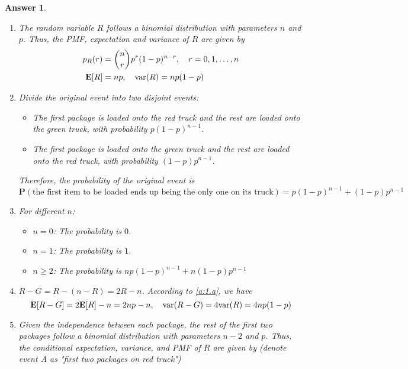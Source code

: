 \documentclass[utf8]{article}
\theoremstyle{definition}%
\theoremstyle{plain}%
\newtheorem{answer}{Answer} %
\begin{document}
\begin{answer} ~
    \begin{enumerate}[label=(\alph*)]
        \item \label{a:1.a} The random variable $R$ follows a binomial distribution with parameters $n$ and $p$. Thus, the PMF, expectation and variance of $R$ are given by
        \begin{equation}
        \begin{aligned}
            p_R(r) &= \binom{n}{r} p^r (1 - p)^{n - r}, \quad r = 0, 1, \ldots, n \\ 
            \mathbf{E}[R] &= np, \quad \mathrm{var}(R) = np(1 - p)
        \end{aligned}
        \end{equation}
        \item Divide the original event into two disjoint events: \begin{itemize}
            \item The first package is loaded onto the red truck and the rest are loaded onto the green truck, with probability $p(1 - p)^{n - 1}$.
            \item The first package is loaded onto the green truck and the rest are loaded onto the red truck, with probability $(1 - p)p^{n - 1}$.
        \end{itemize}
        Therefore, the probability of the original event is
        \begin{equation}
            \mathbf{P}(\text{the first item to be loaded ends up being the only one on its truck}) = p(1 - p)^{n - 1} + (1 - p)p^{n - 1}
        \end{equation}
        \item For different $n$: \begin{itemize}
            \item $n = 0$: The probability is $0$.
            \item $n = 1$: The probability is $1$.
            \item $n \geq 2$: The probability is $np(1-p)^{n-1} + n(1-p)p^{n-1}$
        \end{itemize}
        \item $R - G = R - (n - R) = 2R - n$. According to \ref{a:1.a}, we have
        \begin{equation}
            \mathbf{E}[R - G] = 2\mathbf{E}[R] - n = 2np - n, \quad \mathrm{var}(R - G) = 4\mathrm{var}(R) = 4np(1 - p)
        \end{equation}
        \item Given the independence between each package, the rest of the first two packages follow a binomial distribution with parameters $n - 2$ and $p$. Thus, the conditional expectation, variance, and PMF of $R$ are given by (denote event A as "first two packages on red truck")

\end{enumerate}
\end{answer}
\end{document}
